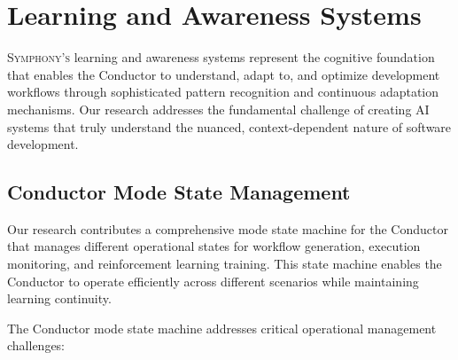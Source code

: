 
\section*{Learning and Awareness Systems}

\vspace{0.5cm}
\lettrine{S}{ymphony's} learning and awareness systems represent the cognitive foundation that enables the Conductor to understand, adapt to, and optimize development workflows through sophisticated pattern recognition and continuous adaptation mechanisms. Our research addresses the fundamental challenge of creating AI systems that truly understand the nuanced, context-dependent nature of software development.

\vspace{0.5cm}
\subsection*{Conductor Mode State Management}

Our research contributes a comprehensive mode state machine for the Conductor that manages different operational states for workflow generation, execution monitoring, and reinforcement learning training. This state machine enables the Conductor to operate efficiently across different scenarios while maintaining learning continuity.


The Conductor mode state machine addresses critical operational management challenges:

